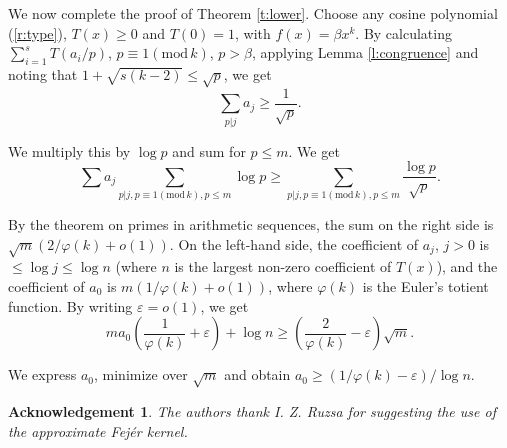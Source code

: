 \documentclass{amsart}
\newtheorem {acknowledgement}{Acknowledgement}
\numberwithin {equation}{section}
\begin{document}
We now complete the proof of Theorem \ref{t:lower}. Choose any cosine
polynomial (\ref{r:type}), $T(x)\geq 0$ and $T(0)=1$, with $f(x)=\beta x^{k}$. By calculating $\sum _{i=1}^{s}T(a_{i}/p)$, $p\equiv 1({\mathrm{mod}}\,k)$, $p>\beta $, applying Lemma \ref{l:congruence} and noting that $1+\sqrt{s(k-2)}\leq \sqrt{p}$, we get 
\begin{equation*}
\sum _{p|j}a_{j}\geq \frac{1}{\sqrt{p}}{\text {.}}
\end{equation*}

We multiply this by $\log p$ and sum for $p\leq m$. We get 
\begin{equation*}
\sum a_{j}\sum _{p|j,p\equiv 1({\mathrm{mod}}\,k),p\leq m}\log p\geq \sum
_{p|j,p\equiv 1({\mathrm{mod}}\,k),p\leq m}\frac{\log p}{\sqrt{p}}{\text {.}}
\end{equation*}

By the theorem on primes in arithmetic sequences, the sum on the right side
is $\sqrt{m}(2/\varphi (k)+o(1))$. On the left-hand side, the coefficient of 
$a_{j}$, $j>0$ is $\leq \log j\leq \log n$ (where $n$ is the largest
non-zero coefficient of $T(x)$), and the coefficient of $a_{0}$ is $m(1/\varphi (k)+o(1))$, where $\varphi (k)$ is the Euler's totient function.
By writing $\varepsilon =o(1)$, we get 
\begin{equation*}
ma_{0}\left( \frac{1}{\varphi (k)}+\varepsilon \right) +\log n\geq \left( 
\frac{2}{\varphi (k)}-\varepsilon \right) \sqrt{m}{\text{.}}
\end{equation*}

We express $a_{0}$, minimize over $\sqrt{m}$ and obtain $a_{0}\geq \left(
1/\varphi (k)-\varepsilon \right) /\log n$.

\begin{acknowledgement}
The authors thank I. Z. Ruzsa for suggesting the use of the approximate Fej\'{e}r kernel.
\end{acknowledgement}
\end{document}
